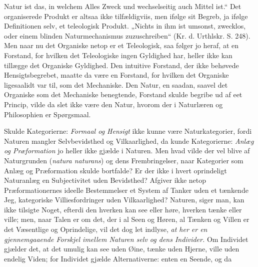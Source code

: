 \documentclass[12pt,a4paper]{book}
\begin{document}
Natur ist das, in welchem Alles Zweck und wechselseitig auch Mittel ist.“ Det
organiserede Produkt er altsaa ikke tilfældigviis, men ifølge sit Begreb, ja
ifølge Definitionen selv, et teleologisk Produkt. „Nichts in ihm ist umsonst,
zwecklos, oder einem blinden Naturmechanismus zuzuschreiben“ (Kr. d. Urthlskr.
S. 248). Men naar nu det Organiske netop er et Teleologisk, saa følger jo
heraf, at en Forstand, for hvilken det Teleologiske ingen Gyldighed har, heller
ikke kan tillægge det Organiske Gyldighed. Den intuitive Forstand, der ikke
behøvede Hensigtsbegrebet, maatte da være en Forstand, for hvilken det
Organiske ligesaalidt var til, som det Mechaniske. Den Natur, en saadan, saavel
det Organiske som det Mechaniske benegtende, Forstand skulde begribe ud af eet
Princip, vilde da slet ikke være den Natur, hvorom der i Naturlæren og
Philosophien er Spørgsmaal.

Skulde Kategorierne: \emph{Formaal og Hensigt} ikke kunne være
Naturkategorier, fordi Naturen mangler Selvbevidsthed og Vilkaarlighed, da
kunde Kategorierne: \emph{Anlæg og Præformation} jo heller ikke gjælde i
Naturen. Men hvad vilde der vel blive af Naturgrunden (\textit{natura
naturans}) og dens Frembringelser, naar Kategorier som Anlæg og Præformation
skulde bortfalde? Er der ikke i hvert oprindeligt Naturanlæg en Subjectivitet
uden Bevidsthed? Afgiver ikke netop Præformationernes ideelle Bestemmelser et
System af Tanker uden et tænkende Jeg, kategoriske Villiesfordringer uden
Vilkaarlighed? Naturen, siger man, kan ikke tilsigte Noget, efterdi den hverken
kan see eller høre, hverken tænke eller ville; men, naar Talen er om det, der i
al Seen og Høren, al Tænken og Villen er det Væsentlige og Oprindelige, vil det
dog let indlyse, \emph{at her er en gjennemgaaende Forskjel imellem Naturen
selv og dens Individer.} Om Individet gjælder det, at det umulig kan see uden
Øine, tænke uden Hjerne, ville uden endelig Viden; for Individet gjælde
Alternativerne: enten en Seende, og da
\end{document}

